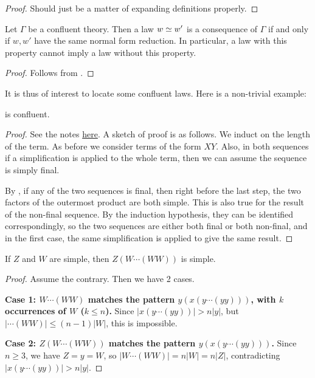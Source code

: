 \begin{proof}
  Should just be a matter of expanding definitions properly.
\end{proof}

\begin{corollary}\label{confluent-anti-impl}
  Let $\Gamma$ be a confluent theory.  Then a law $w \simeq w'$ is a consequence of $\Gamma$ if and only if $w,w'$ have the same normal form reduction.  In particular, a law with this property cannot imply a law without this property.
\end{corollary}

\begin{proof}
  Follows from .
\end{proof}

It is thus of interest to locate some confluent laws.  Here is a non-trivial example:

\begin{theorem}[477 confluent]\label{477-confl}
   is confluent.
\end{theorem}

\begin{proof}
  See the notes \href{https://www.overleaf.com/project/66f847bb14d0d8f0b77f74e1}{here}.
  A sketch of proof is as follows. We induct on the length of the term.
  As before we consider terms of the form $XY$.
  Also, in both sequences if a simplification is applied to the whole term,
  then we can assume the sequence is simply final.

  By , if any of the two sequences is final,
  then right before the last step, the two factors of the outermost product are both simple.
  This is also true for the result of the non-final sequence. By the induction hypothesis,
  they can be identified correspondingly, so the two sequences are either both final or both
  non-final, and in the first case, the same simplification is applied to give the same result.
\end{proof}

\begin{lemma}[477 lemma]\label{477-lemma}
    If $Z$ and $W$ are simple, then $Z(W\cdots(WW))$ is simple.
\end{lemma}

\begin{proof}
    Assume the contrary. Then we have 2 cases.

    \textbf{Case 1: $W\cdots(WW)$ matches the pattern
    $y(x(y\cdots(yy)))$, with $k$ occurrences of $W$ ($k \le n$).}
    Since $|x(y\cdots(yy))| > n|y|$, but $|\cdots(WW)| \le (n-1)|W|$, this is impossible.

    \textbf{Case 2: $Z(W\cdots(WW))$ matches the pattern
    $y(x(y\cdots(yy)))$.} Since $n \ge 3$, we have $Z = y = W$,
    so $|W\cdots(WW)| = n|W| = n|Z|$,
    contradicting $|x(y\cdots(yy))| > n|y|$.
\end{proof}
